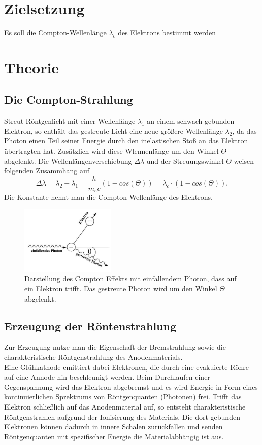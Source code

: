 \newpage
\section*{Zielsetzung}
Es soll die Compton-Wellenlänge $\lambda_c$ des Elektrons bestimmt werden
\section{Theorie}
\subsection{Die Compton-Strahlung}
\label{sec:theorie}
Streut Röntgenlicht mit einer Wellenlänge $\lambda_1$ an einem schwach gebunden Elektron, so enthält das gestreute Licht eine neue 
größere Wellenlänge $\lambda_2$, da das Photon einen Teil seiner Energie durch den inelastischen Stoß
an das Elektron übertragten hat. Zusätzlich wird diese Wlennenlänge um den Winkel $\Theta$ abgelenkt.
Die Wellenlängenverschiebung $\Delta \lambda$ und der Streuungswinkel 
$\Theta$ weisen folgenden Zusammhang auf
\begin{equation}
    \Delta \lambda = \lambda_2 - \lambda_1 =\frac{h}{m_e c}\left(1-cos(\Theta)\right)=\lambda_c \cdot \left(1-cos(\Theta)\right).
\end{equation}
Die Konstante nennt man die Compton-Wellenlänge des Elektrons.
\begin{figure}
    \centering
    \includegraphics[width=0.4\textwidth]{compton/compton_effekt.jpg}
    \caption{Darstellung des Compton Effekts mit einfallendem Photon, dass
    auf ein Elektron trifft. Das gestreute Photon wird um den Winkel $\Theta$
    abgelenkt.}
\end{figure}

\subsection{Erzeugung der Röntenstrahlung}
Zur Erzeugung nutze man die Eigenschaft der Bremstrahlung sowie die charakteristische
Röntgenstrahlung des Anodenmaterials.\\ 
Eine Glühkathode emittiert dabei Elektronen, die durch eine evakuierte Röhre auf 
eine Annode hin beschleunigt werden. 
Beim Durchlaufen einer Gegenspannung wird das Elektron abgebremst und es wird Energie
in Form eines kontinuierlichen Sprektrums von Röntgenquanten (Photonen) frei. 
Trifft das Elektron schließlich auf das Anodenmaterial auf, so entsteht charakteristische Röntgenstrahlen aufgrund der Ionisierung
des Materials. Die dort gebunden Elektronen können dadurch in innere Schalen zurückfallen und senden Röntgenquanten mit spezifischer
Energie die Materialabhängig ist aus.


